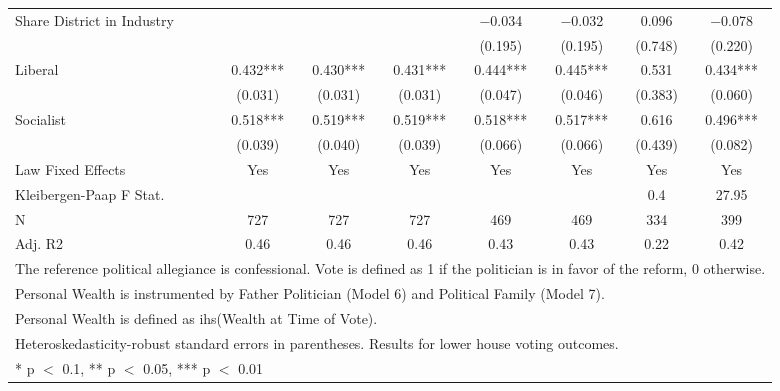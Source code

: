 \begin{table}
\begin{tabular}[t]{lccccccc}
Share District in Industry &  &  &  & \num{-0.034} & \num{-0.032} & \num{0.096} & \num{-0.078}\\
 &  &  &  & (\num{0.195}) & (\num{0.195}) & (\num{0.748}) & (\num{0.220})\\
Liberal & \num{0.432}*** & \num{0.430}*** & \num{0.431}*** & \num{0.444}*** & \num{0.445}*** & \num{0.531} & \num{0.434}***\\
 & (\num{0.031}) & (\num{0.031}) & (\num{0.031}) & (\num{0.047}) & (\num{0.046}) & (\num{0.383}) & (\num{0.060})\\
Socialist & \num{0.518}*** & \num{0.519}*** & \num{0.519}*** & \num{0.518}*** & \num{0.517}*** & \num{0.616} & \num{0.496}***\\
 & (\num{0.039}) & (\num{0.040}) & (\num{0.039}) & (\num{0.066}) & (\num{0.066}) & (\num{0.439}) & (\num{0.082})\\
\midrule
Law Fixed Effects & Yes & Yes & Yes & Yes & Yes & Yes & Yes\\
Kleibergen-Paap F Stat. &  &  &  &  &  & 0.4 & 27.95\\
N & \num{727} & \num{727} & \num{727} & \num{469} & \num{469} & \num{334} & \num{399}\\
Adj. R2 & \num{0.46} & \num{0.46} & \num{0.46} & \num{0.43} & \num{0.43} & \num{0.22} & \num{0.42}\\
\bottomrule
\multicolumn{8}{l}{\rule{0pt}{1em}The reference political allegiance is confessional. Vote is defined as 1 if the politician is in favor of the reform, 0 otherwise.}\\
\multicolumn{8}{l}{\rule{0pt}{1em}Personal Wealth is instrumented by Father Politician (Model 6) and Political Family (Model 7).}\\
\multicolumn{8}{l}{\rule{0pt}{1em}Personal Wealth is defined as ihs(Wealth at Time of Vote).}\\
\multicolumn{8}{l}{\rule{0pt}{1em}Heteroskedasticity-robust standard errors in parentheses. Results for lower house voting outcomes.}\\
\multicolumn{8}{l}{\rule{0pt}{1em}* p $<$ 0.1, ** p $<$ 0.05, *** p $<$ 0.01}\\
\end{tabular}
\end{table}

